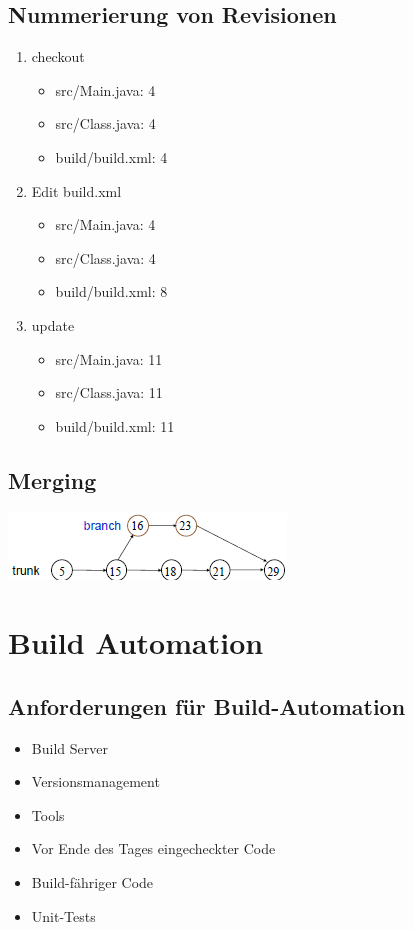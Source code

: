 \documentclass[a4paper,10pt]{article}
\begin{document}
\subsection{Nummerierung von Revisionen}
\begin{enumerate}
 \item checkout
\begin{itemize}
 \item src/Main.java: 4
 \item src/Class.java: 4
 \item build/build.xml: 4
\end{itemize}
 \item Edit build.xml
\begin{itemize}
 \item src/Main.java: 4
 \item src/Class.java: 4
 \item build/build.xml: 8
\end{itemize}
 \item update
\begin{itemize}
 \item src/Main.java: 11
 \item src/Class.java: 11
 \item build/build.xml: 11
\end{itemize}
\end{enumerate}

\subsection{Merging}
\includegraphics{merging.png}


\pagebreak
\section{Build Automation}
\subsection{Anforderungen f\"ur Build-Automation}
\begin{itemize}
 \item Build Server
 \item Versionsmanagement
 \item Tools
 \item Vor Ende des Tages eingecheckter Code
 \item Build-f\"ahriger Code
 \item Unit-Tests
\end{itemize}
\end{document}
